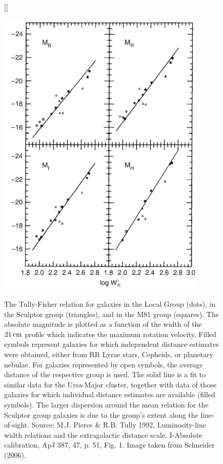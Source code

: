\documentclass[a4paper,10pt]{article}
\begin{document}
\begin{figure}[h]
[\FBwidth]
{\caption{\footnotesize{The Tully-Fisher relation for galaxies in the Local Group (dots), in the Sculptor group (triangles), and in the M81 group (squares). The absolute magnitude is plotted as a function of the width of the $21\,{\rm cm}$ profile which indicates the maximum rotation velocity. Filled symbols represent galaxies for which independent distance estimates were obtained, either from RR Lyrae stars, Cepheids, or planetary nebulae. For galaxies represented by open symbols, the average distance of the respective group is used. The solid line is a fit to similar data for the Ursa-Major cluster, together with data of those galaxies for which individual distance estimates are available (filled symbols). The larger dispersion around the mean relation for the Sculptor group galaxies is due to the group’s extent along the line-of-sight. Source: M.J. Pierce \& R.B. Tully 1992, Luminosity-line width relations and the extragalactic distance scale. I-Absolute calibration, ApJ 387, 47, p. 51, Fig. 1. Image taken from Schneider (2006).}}
\label{fig:tullyfisher}}
{\includegraphics[width=10cm]{figures/TullyFisher.png}}
\end{figure}
\end{document}
